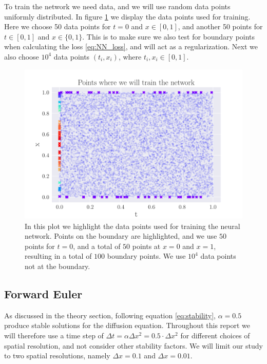 \documentclass[12pt]{extarticle}
\begin{document}
To train the network we need data, and we will use random data points uniformly distributed. In figure \ref{fig:NN_training_points} we display the data points used for training. Here we choose 50 data points for $t=0$ and $x\in[0,1]$, and another 50 points for $t\in[0,1]$ and $x\in\{0,1\}$. This is to make sure we also test for boundary points when calculating the loss \eqref{eq:NN_loss}, and will act as a regularization. Next we also choose $10^4$ data points $(t_i, x_i)$, where $t_i,x_i\in[0,1]$. 
\begin{figure}[h]
	\centering
	\includegraphics[width=\linewidth]{../output/plots/training_points.pdf}
	\caption{In this plot we highlight the data points used for training the neural network. Points on the boundary are highlighted, and we use $50$ points for $t=0$, and a total of $50$ points at $x=0$ and $x=1$, resulting in a total of $100$ boundary points. We use $10^4$ data points not at the boundary.} \label{fig:NN_training_points}
\end{figure}

\subsection{Forward Euler}

As discussed in the theory section, following equation \eqref{eq:stability}, $\alpha=0.5$ produce stable solutions for the diffusion equation. Throughout this report we will therefore use a time step of $\Delta t = \alpha \Delta x^2 = 0.5\cdot \Delta x^2$ for different choices of spatial resolution, and not consider other stability factors. We will limit our study to two spatial resolutions, namely $\Delta x = 0.1$ and $\Delta x = 0.01$.  
\end{document}
